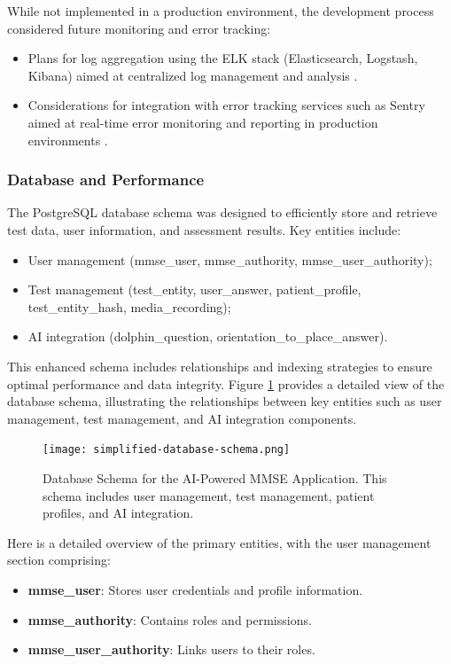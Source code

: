 While not implemented in a production environment, the development process considered future monitoring and error tracking:
\begin{itemize}
\item Plans for log aggregation using the ELK stack (Elasticsearch, Logstash, Kibana) aimed at centralized log management and analysis \cite{elk}.
\item Considerations for integration with error tracking services such as Sentry aimed at real-time error monitoring and reporting in production environments \cite{sentry}.
\end{itemize}

\subsubsection{Database and Performance}
The PostgreSQL database schema was designed to efficiently store and retrieve test data, user information, and assessment results. Key entities include:
\begin{itemize}
    \item User management (mmse\_user, mmse\_authority, mmse\_user\_authority);
    \item Test management (test\_entity, user\_answer, patient\_profile, test\_entity\_hash, media\_recording);
    \item AI integration (dolphin\_question, orientation\_to\_place\_answer).
\end{itemize}

This enhanced schema includes relationships and indexing strategies to ensure optimal performance and data integrity. Figure \ref{fig:database-schema} provides a detailed view of the database schema, illustrating the relationships between key entities such as user management, test management, and AI integration components.

\begin{figure}[h!]
\begin{center}
\texttt{[image: simplified-database-schema.png]}
\caption{Database Schema for the AI-Powered MMSE Application. This schema includes user management, test management, patient profiles, and AI integration.}
\label{fig:database-schema}
\end{center}
\end{figure}

Here is a detailed overview of the primary entities, with the user management section comprising:
\begin{itemize}
    \item \textbf{mmse\_user}: Stores user credentials and profile information.
    \item \textbf{mmse\_authority}: Contains roles and permissions.
    \item \textbf{mmse\_user\_authority}: Links users to their roles.
\end{itemize}

